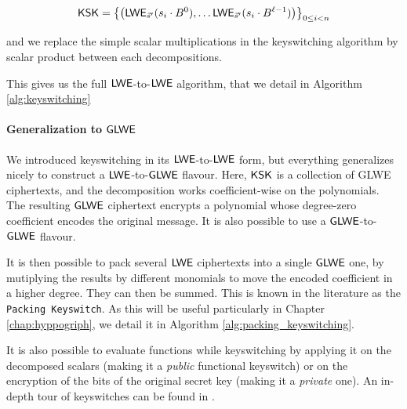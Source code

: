 \[
	\textsf{KSK} = \left \lbrace \left ( \textsf{LWE}_{\vec s'} (s_i \cdot B^0), \dots  \textsf{LWE}_{\vec s'} (s_i \cdot B^{\ell-1}) \right ) \right \rbrace_{0 \le i < n}
\]


and we replace the simple scalar multiplications in the keyswitching algorithm by scalar product between each decompositions. %


This gives us the full $\textsf{LWE}$-to-$\textsf{LWE}$ algorithm, that we detail in Algorithm \ref{alg:keyswitching}








\paragraph{Generalization to $\textsf{GLWE}$}


We introduced keyswitching in its $\textsf{LWE}$-to-$\textsf{LWE}$ form, but everything generalizes nicely to construct a $\textsf{LWE}$-to-$\textsf{GLWE}$ flavour. Here, $\textsf{KSK}$ is a collection of GLWE ciphertexts, and the decomposition works coefficient-wise on the polynomials. The resulting $\textsf{GLWE}$ ciphertext encrypts a polynomial whose degree-zero coefficient encodes the original message. It is also possible to use a $\textsf{GLWE}$-to-$\textsf{GLWE}$ flavour.


It is then possible to pack several $\textsf{LWE}$ ciphertexts into a single $\textsf{GLWE}$ one, by mutiplying the results by different monomials to move the encoded coefficient in a higher degree. They can then be summed. This is known in the literature as the \texttt{Packing Keyswitch}. As this will be useful particularly in Chapter \ref{chap:hyppogriph}, we detail it in Algorithm \ref{alg:packing_keyswitching}.




It is also possible to evaluate functions while keyswitching by applying it on the decomposed scalars (making it a \textit{public} functional keyswitch) or on the encryption of the bits of the original secret key (making it a \textit{private} one). An in-depth tour of keyswitches can be found in \cite{these_tap}.


